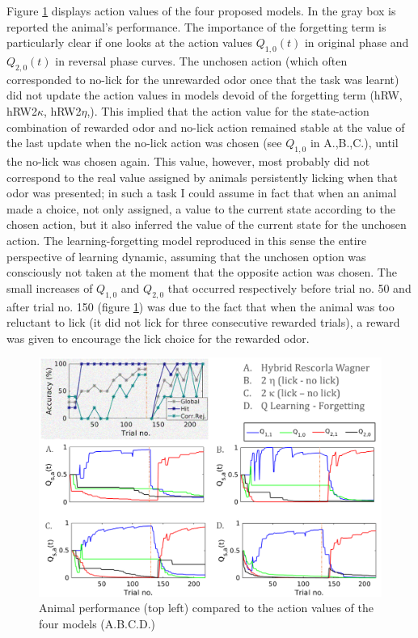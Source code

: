 Figure \ref{fig:4models} displays action values of the four proposed models. In the gray box is reported the animal's performance. The importance of the forgetting term is particularly clear if one looks at the action values $Q_{1,0}(t)$ in original phase and $Q_{2,0}(t)$ in reversal phase curves. The unchosen action (which often corresponded to no-lick for the unrewarded odor once that the task was learnt) did not update the action values in models devoid of the forgetting term (hRW, hRW2$\kappa$, hRW2$\eta$,). This implied that the action value for the state-action combination of rewarded odor and no-lick action remained stable at the value of the last update when the no-lick action was chosen (see $Q_{1,0}$ in A.,B.,C.), until the no-lick was chosen again. This value, however, most probably did not correspond to the real value assigned by animals persistently licking when that odor was presented; in such a task I could assume in fact that when an animal made a choice, not only assigned, a value to the current state according to the chosen action, but it also inferred the value of the current state for the unchosen action. The learning-forgetting model reproduced in this sense the entire perspective of learning dynamic, assuming that the unchosen option was consciously not taken at the moment that the opposite action was chosen. The small increases of $Q_{1,0}$ and $Q_{2,0}$ that occurred respectively before trial no. 50 and after trial no. 150 (figure \ref{fig:4models}) was due to the fact that when the animal was too reluctant to lick (it did not lick for three consecutive rewarded trials), a reward was given to encourage the lick choice for the rewarded odor. 
\begin{figure}
    \centering
    \includegraphics[scale=0.9]{figures/Resume4models3.png}
    \caption{Animal performance (top left) compared to the action values of the four models (A.B.C.D.)}
    \label{fig:4models}
\end{figure}

